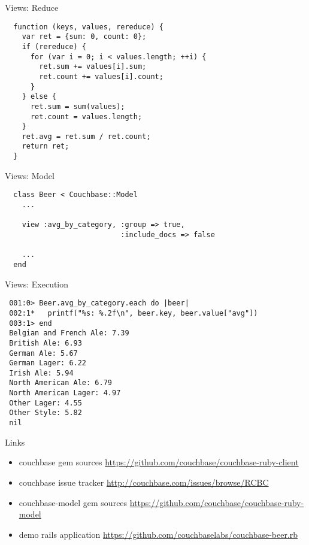 \documentclass[aspectratio=43,handout]{beamer}
\begin{document}
\begin{frame}[fragile]{Views: Reduce}
  \begin{verbatim}
  function (keys, values, rereduce) {
    var ret = {sum: 0, count: 0};
    if (rereduce) {
      for (var i = 0; i < values.length; ++i) {
        ret.sum += values[i].sum;
        ret.count += values[i].count;
      }
    } else {
      ret.sum = sum(values);
      ret.count = values.length;
    }
    ret.avg = ret.sum / ret.count;
    return ret;
  }
  \end{verbatim}
\end{frame}

\begin{frame}[fragile]{Views: Model}
  \begin{verbatim}
  class Beer < Couchbase::Model
    ...

    view :avg_by_category, :group => true,
                           :include_docs => false

    ...
  end
  \end{verbatim}
\end{frame}

\begin{frame}[fragile]{Views: Execution}
  \begin{verbatim}
 001:0> Beer.avg_by_category.each do |beer|
 002:1*   printf("%s: %.2f\n", beer.key, beer.value["avg"])
 003:1> end
 Belgian and French Ale: 7.39
 British Ale: 6.93
 German Ale: 5.67
 German Lager: 6.22
 Irish Ale: 5.94
 North American Ale: 6.79
 North American Lager: 4.97
 Other Lager: 4.55
 Other Style: 5.82
 nil
  \end{verbatim}
\end{frame}

\begin{frame}[fragile]{Links}
  \begin{itemize}
    \item couchbase gem sources
      \url{https://github.com/couchbase/couchbase-ruby-client}
    \item couchbase issue tracker
      \url{http://couchbase.com/issues/browse/RCBC}
    \item couchbase-model gem sources
      \url{https://github.com/couchbase/couchbase-ruby-model}
    \item demo rails application
      \url{https://github.com/couchbaselabs/couchbase-beer.rb}
  \end{itemize}
\end{frame}
\end{document}
